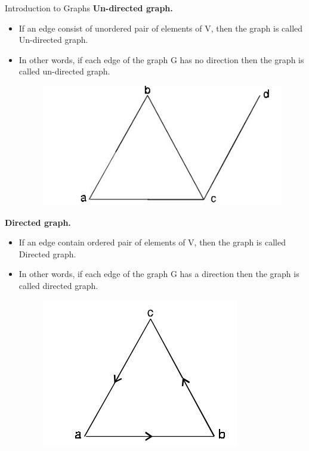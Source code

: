 \documentclass{beamer}
\begin{document}
\begin{frame}{Introduction to Graphs}
	\textbf{Un-directed graph.}
	\begin{itemize}
		\item If an edge consist of unordered pair of elements of V, then the graph is called Un-directed graph.
		\item In other words, if each edge of the graph G has no direction then the graph is called un-directed
		graph.
		\begin{figure}
			\includegraphics[scale=.3]{img/m7}
		\end{figure}
	\end{itemize}
	\textbf{Directed graph.}
	\begin{itemize}
		\item If an edge contain ordered pair of elements of V, then the graph is called Directed graph.
		\item In other words, if each edge of the graph G has a direction then the graph is called directed
		graph.
		\begin{figure}
			\includegraphics[scale=.3]{img/m8}
		\end{figure}
	\end{itemize}
\end{frame}
\end{document}
